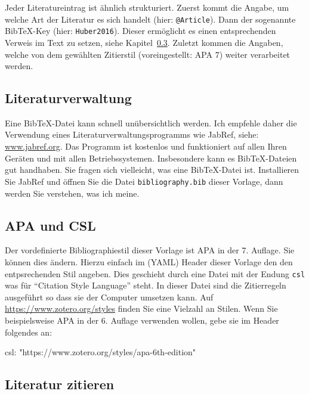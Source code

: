 \documentclass[
  stu,
  floatsintext,
  longtable,
  a4paper,
  nolmodern,
  notxfonts,
  notimes,
  donotrepeattitle,
  colorlinks=true,linkcolor=blue,citecolor=blue,urlcolor=blue]{apa7}
\newenvironment{Shaded}{\begin{snugshade}}{\end{snugshade}}
\newcommand{\NormalTok}[1]{\textcolor[rgb]{0.00,0.23,0.31}{#1}}
\begin{document}
Jeder Literatureintrag ist ähnlich strukturiert. Zuerst kommt die
Angabe, um welche Art der Literatur es sich handelt (hier:
\texttt{@Article}). Dann der sogenannte BibTeX-Key (hier:
\texttt{Huber2016}). Dieser ermöglicht es einen entsprechenden Verweis
im Text zu setzen, siehe Kapitel~\ref{sec-cite}. Zuletzt kommen die
Angaben, welche von dem gewählten Zitierstil (voreingestellt: APA 7)
weiter verarbeitet werden.

\subsection{Literaturverwaltung}\label{sec-jabref}

Eine BibTeX-Datei kann schnell unübersichtlich werden. Ich empfehle
daher die Verwendung eines Literaturverwaltungsprogramms wie JabRef,
siehe: \url{www.jabref.org}. Das Programm ist kostenlos und funktioniert
auf allen Ihren Geräten und mit allen Betriebssystemen. Insbesondere
kann es BibTeX-Dateien gut handhaben. Sie fragen sich vielleicht, was
eine BibTeX-Datei ist. Installieren Sie JabRef und öffnen Sie die Datei
\texttt{bibliography.bib} dieser Vorlage, dann werden Sie verstehen, was
ich meine.

\subsection{APA und CSL}\label{sec-apa}

Der vordefinierte Bibliographiestil dieser Vorlage ist APA in der 7.
Auflage. Sie können dies ändern. Hierzu einfach im (YAML) Header dieser
Vorlage den den entpsrechenden Stil angeben. Dies geschieht durch eine
Datei mit der Endung \texttt{csl} was für ``Citation Style Language''
steht. In dieser Datei sind die Zitierregeln ausgeführt so dass sie der
Computer umsetzen kann. Auf \url{https://www.zotero.org/styles} finden
Sie eine Vielzahl an Stilen. Wenn Sie beispielsweise APA in der 6.
Auflage verwenden wollen, gebe sie im Header folgendes an:

\begin{Shaded}
\begin{Highlighting}[]
\NormalTok{csl: "https://www.zotero.org/styles/apa{-}6th{-}edition"}
\end{Highlighting}
\end{Shaded}

\subsection{Literatur zitieren}\label{sec-cite}
\end{document}
